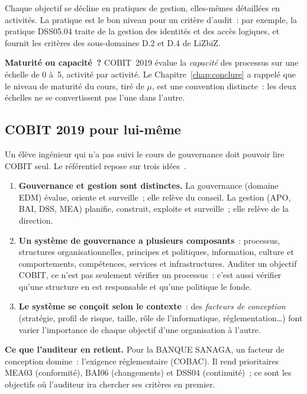 Chaque objectif se décline en pratiques de gestion, elles-mêmes détaillées
en activités. La pratique est le bon niveau pour un critère d'audit~: par
exemple, la pratique DSS05.04 traite de la gestion des identités et des
accès logiques, et fournit les critères des sous-domaines D.2 et D.4 de
LiZbiZ.

\begin{boxinfo}
\textbf{Maturité ou capacité~?} COBIT~2019 évalue la \emph{capacité} des
processus sur une échelle de 0 à~5, activité par activité. Le
Chapitre~\ref{chap:conclure} a rappelé que le niveau de maturité du cours,
tiré de $\mu$, est une convention distincte~: les deux échelles ne se
convertissent pas l'une dans l'autre.
\end{boxinfo}

\subsection{COBIT 2019 pour lui-même}

Un élève ingénieur qui n'a pas suivi le cours de gouvernance doit pouvoir
lire COBIT seul. Le référentiel repose sur trois idées~\cite{isaca2018cobitintro}.
\begin{enumerate}
    \item \textbf{Gouvernance et gestion sont distinctes.} La gouvernance
          (domaine EDM) évalue, oriente et surveille~; elle relève du
          conseil. La gestion (APO, BAI, DSS, MEA) planifie, construit,
          exploite et surveille~; elle relève de la direction.
    \item \textbf{Un système de gouvernance a plusieurs composants}~:
          processus, structures organisationnelles, principes et
          politiques, information, culture et comportements, compétences,
          services et infrastructures. Auditer un objectif COBIT, ce n'est
          pas seulement vérifier un processus~: c'est aussi vérifier qu'une
          structure en est responsable et qu'une politique le fonde.
    \item \textbf{Le système se conçoit selon le contexte}~: des
          \emph{facteurs de conception} (stratégie, profil de risque,
          taille, rôle de l'informatique, réglementation\ldots) font varier
          l'importance de chaque objectif d'une organisation à l'autre.
\end{enumerate}

\begin{boxinfo}
\textbf{Ce que l'auditeur en retient.} Pour la BANQUE SANAGA, un facteur
de conception domine~: l'exigence réglementaire (COBAC). Il rend
prioritaires MEA03 (conformité), BAI06 (changements) et DSS04
(continuité)~; ce sont les objectifs où l'auditeur ira chercher ses
critères en premier.
\end{boxinfo}


